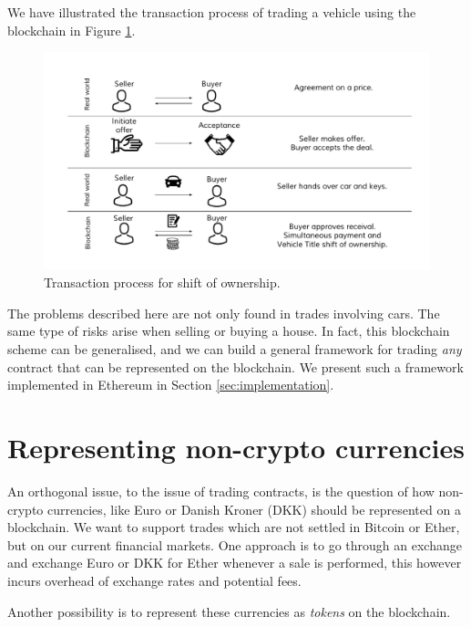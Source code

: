 \documentclass[oneside,a4paper,10pts,article]{memoir}
\begin{document}
We have illustrated the transaction process of trading a vehicle using
the blockchain in Figure \ref{fig:shift-of-ownership}.

\begin{figure}
  \centering
  \includegraphics[width=\textwidth]{shift-of-ownership.pdf}
  \caption{Transaction process for shift of ownership.}
  \label{fig:shift-of-ownership}
\end{figure}

The problems described here are not only found in trades involving
cars. The same type of risks arise when selling or buying a house. In
fact, this blockchain scheme can be generalised, and we can build a
general framework for trading \textit{any} contract that can be
represented on the blockchain. We present such a framework implemented
in Ethereum in Section \ref{sec:implementation}.


\chapter{Representing non-crypto currencies}
\label{sec:currency}
An orthogonal issue, to the issue of trading contracts, is the
question of how non-crypto currencies, like Euro or Danish Kroner
(DKK) should be represented on a blockchain. We want to support trades
which are not settled in Bitcoin or Ether, but on our current
financial markets. One approach is to go through an exchange and
exchange Euro or DKK for Ether whenever a sale is performed, this
however incurs overhead of exchange rates and potential fees.

Another possibility is to represent these currencies as
\textit{tokens} on the blockchain. 
\end{document}
